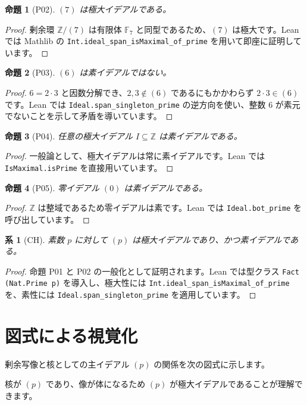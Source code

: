 \documentclass[12pt]{ltjsarticle}
\theoremstyle{definition}
\theoremstyle{plain}
\newtheorem{proposition}{命題}
\newtheorem{corollary}{系}
\theoremstyle{remark}
\begin{document}
\begin{proposition}[P02]
$(7)$ は極大イデアルである。
\end{proposition}
\begin{proof}
剰余環 $\mathbb{Z}/(7)$ は有限体 $\mathbb{F}_7$ と同型であるため、$(7)$ は極大です。Lean では Mathlib の \texttt{Int.ideal\_span\_isMaximal\_of\_prime} を用いて即座に証明しています。
\end{proof}

\begin{proposition}[P03]
$(6)$ は素イデアルではない。
\end{proposition}
\begin{proof}
$6=2\cdot 3$ と因数分解でき、$2,3 \notin (6)$ であるにもかかわらず $2\cdot 3 \in (6)$ です。Lean では \texttt{Ideal.span\_singleton\_prime} の逆方向を使い、整数 $6$ が素元でないことを示して矛盾を導いています。
\end{proof}

\begin{proposition}[P04]
任意の極大イデアル $I \subseteq \mathbb{Z}$ は素イデアルである。
\end{proposition}
\begin{proof}
一般論として、極大イデアルは常に素イデアルです。Lean では \texttt{IsMaximal.isPrime} を直接用いています。
\end{proof}

\begin{proposition}[P05]
零イデアル $(0)$ は素イデアルである。
\end{proposition}
\begin{proof}
$\mathbb{Z}$ は整域であるため零イデアルは素です。Lean では \texttt{Ideal.bot\_prime} を呼び出しています。
\end{proof}

\begin{corollary}[CH]
素数 $p$ に対して $(p)$ は極大イデアルであり、かつ素イデアルである。
\end{corollary}
\begin{proof}
命題 P01 と P02 の一般化として証明されます。Lean では型クラス \texttt{Fact (Nat.Prime p)} を導入し、極大性には \texttt{Int.ideal\_span\_isMaximal\_of\_prime} を、素性には \texttt{Ideal.span\_singleton\_prime} を適用しています。
\end{proof}

\section{図式による視覚化}
剰余写像と核としての主イデアル $(p)$ の関係を次の図式に示します。
\begin{center}
\end{center}
核が $(p)$ であり、像が体になるため $(p)$ が極大イデアルであることが理解できます。
\end{document}

